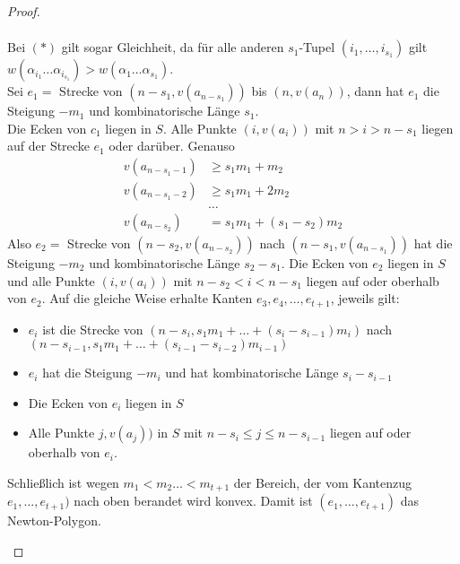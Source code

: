 \begin{proof}
\begin{enumerate}[(1)]
\begin{align*}
\end{align*}
Bei $(*)$ gilt sogar Gleichheit, da für alle anderen $s_1$-Tupel $(i_1, \dots, i_{s_1})$ gilt $w(\alpha_{i_1} \dots \alpha_{i_{s_1}})>w(\alpha_1 \dots \alpha_{s_1})$.\\
Sei $e_1=$ Strecke von $(n-s_1, v(a_{n-s_1}))$ bis $(n, v(a_n))$, dann hat $e_1$ die Steigung $-m_1$ und kombinatorische Länge $s_1$.\\
Die Ecken von $c_1$ liegen in $S$. Alle Punkte $(i, v(a_i))$ mit $n>i>n-s_1$ liegen auf der Strecke $e_1$ oder darüber. Genauso
\begin{align*}
v(a_{n-s_1-1})&\geq s_1m_1+m_2\\
v(a_{n-s_1-2})&\geq s_1m_1+2m_2\\
&\dots\\
v(a_{n-s_2})&=s_1m_1+(s_1-s_2)m_2
\end{align*}
Also $e_2=$ Strecke von $(n-s_2, v(a_{n-s_2}))$ nach $(n-s_1, v(a_{n-s_1}))$ hat die Steigung $-m_2$ und kombinatorische Länge $s_2-s_1$. Die Ecken von $e_2$ liegen in $S$ und alle Punkte $(i, v(a_i))$ mit $n-s_2 < i<n-s_1$ liegen auf oder oberhalb von $e_2$. Auf die gleiche Weise erhalte Kanten $e_3, e_4, \dots, e_{t+1}$, jeweils gilt:
\begin{itemize}
\item $e_i$ ist die Strecke von $(n-s_i, s_1m_1+\dots+(s_i-s_{i-1})m_i)$ nach $(n-s_{i-1}, s_1m_1+\dots+(s_{i-1}-s_{i-2})m_{i-1})$
\item $e_i$ hat die Steigung $-m_i$ und hat kombinatorische Länge $s_i-s_{i-1}$
\item Die Ecken von $e_i$ liegen in $S$
\item Alle Punkte $j, v(a_j))$ in $S$ mit $n-s_i \leq j \leq n-{s_{i-1}}$ liegen auf oder oberhalb von $e_i$.
\end{itemize}
Schließlich ist wegen $m_1 < m_2 \dots < m_{t+1}$ der Bereich, der vom Kantenzug $e_1, \dots, e_{t+1})$ nach oben berandet wird konvex. Damit ist $(e_1, \dots , e_{t+1})$ das Newton-Polygon.
\end{enumerate}
\end{proof}

